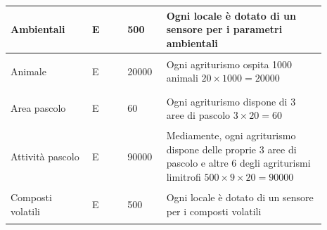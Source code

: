 \documentclass[12pt,a4paper]{article}
\begin{document}
\begin{center}
\begin{longtable}{|p{0.23\linewidth}|p{0.1\linewidth}|p{0.11\linewidth}|p{0.45\linewidth}|}
\hline
Ambientali 				& \begin{center}
\vspace{-25pt}E
\end{center}
					& \begin{center}
					\vspace{-25pt}500\end{center}
					&  Ogni locale è dotato di un sensore per i parametri ambientali \\ 

\hline
Animale 				& \begin{center}
\vspace{-25pt}E
\end{center}
					& \begin{center}
					\vspace{-25pt}20000\end{center}
					&  Ogni agriturismo ospita 1000 animali $20\times 1000=20000$ \\ 

\hline
Area pascolo 				& \begin{center}
\vspace{-25pt}E
\end{center}
					& \begin{center}
					\vspace{-25pt}60\end{center}
					&  Ogni agriturismo dispone di 3 aree di pascolo $3\times 20= 60$\\ 

\hline
Attività pascolo 				& \begin{center}
\vspace{-25pt}E
\end{center}
					& \begin{center}
					\vspace{-25pt}90000\end{center}
					&  Mediamente, ogni agriturismo dispone delle proprie 3 aree di pascolo e altre 6 degli agriturismi limitrofi $500\times 9 \times 20 = 90000$\\ 

\hline
Composti volatili 				& \begin{center}
\vspace{-25pt}E
\end{center}
					& \begin{center}
					\vspace{-25pt}500\end{center}
					&  Ogni locale è dotato di un sensore per i composti volatili \\ 


\end{longtable}
\end{center}
\end{document}
